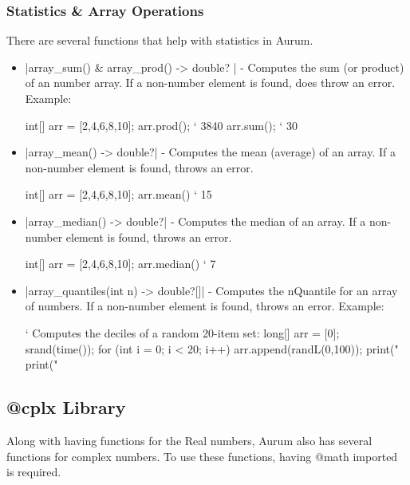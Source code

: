 \documentclass[12pt, letterpaper, oneside]{article}
\begin{document}
	\subsubsection{Statistics \& Array Operations}
	There are several functions that help with statistics in Aurum.
	\begin{itemize}
			\item[--] \spverb|array_sum() & array_prod() -> double? | - Computes the sum (or product) of an number array. If a non-number element is found, does throw an error. Example:
			
			
			\begin{spverbatim}
				int[] arr = [2,4,6,8,10];
				arr.prod(); ` 3840
				arr.sum(); ` 30
			\end{spverbatim}
			\newline
			\item[--] \spverb|array_mean() -> double?| - Computes the mean (average) of an array. If a non-number element is found, throws an error.
			
			
			\begin{spverbatim}
				int[] arr = [2,4,6,8,10];
				arr.mean() ` 15
			\end{spverbatim}
			\newline
			\item[--] \spverb|array_median() -> double?| - Computes the median of an array. If a non-number element is found, throws an error.
			
			
			\begin{spverbatim}
				int[] arr = [2,4,6,8,10];
				arr.median() ` 7
			\end{spverbatim}
			\newline
			\item[--] \spverb|array_quantiles(int n) -> double?[]| - Computes the nQuantile for an array of numbers. If a non-number element is found, throws an error. Example:
			\begin{spverbatim}
				` Computes the deciles of a random 20-item set:
				long[] arr = [0];
				srand(time());
				for (int i = 0; i < 20; i++) {
					arr.append(randL(0,100));
				}
				print("\n%
				print("\n%
			\end{spverbatim}
	\end{itemize}
	\subsection{@cplx Library}
	\label{sec:cplx}
	Along with having functions for the Real numbers, Aurum also has several functions for complex numbers. To use these functions, having @math imported is required.
\end{document}
